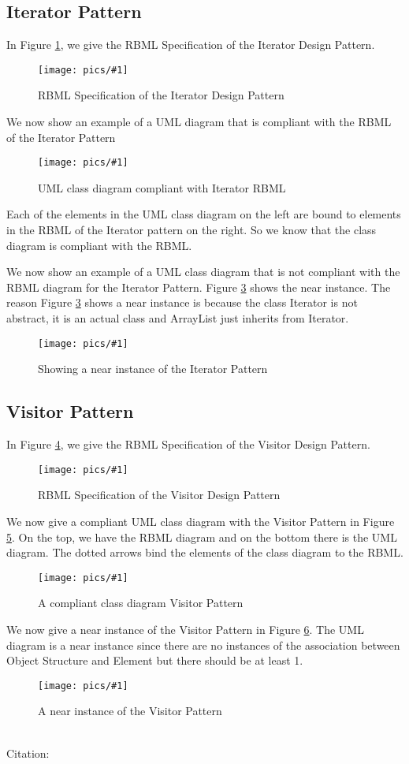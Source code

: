 \documentclass{article}
\newcommand{\fig}[3]{ 
	\begin{figure}[h]
		\centering
		\caption{#3}
		\texttt{[image: pics/\#1]}
		\label{fig:#1}
	\end{figure} 
}
\begin{document}
\subsection*{Iterator Pattern}

In Figure \ref{fig:iterator-rbml}, we give the RBML Specification of the Iterator Design Pattern.

\fig{iterator-rbml}{.5}{RBML Specification of the Iterator Design Pattern}

We now show an example of a UML diagram that is compliant with the RBML of the Iterator Pattern
\newpage
\fig{iterator-inst}{0.75}{UML class diagram compliant with Iterator RBML}

Each of the elements in the UML class diagram on the left are bound to elements in the RBML of the Iterator pattern on the right. So we know that the class diagram is compliant with the RBML.

We now show an example of a UML class diagram that is not compliant with the RBML diagram for the Iterator Pattern. Figure \ref{fig:iterator-ninst} shows the near instance. The reason Figure \ref{fig:iterator-ninst} shows a near instance is because the class Iterator is not abstract, it is an actual class and ArrayList just inherits from Iterator.

\fig{iterator-ninst}{0.15}{Showing a near instance of the Iterator Pattern}
\newpage
\subsection*{Visitor Pattern}
In Figure \ref{fig:visitor-rbml}, we give the RBML Specification of the Visitor Design Pattern.

\fig{visitor-rbml}{.75}{RBML Specification of the Visitor Design Pattern}

We now give a compliant UML class diagram with the Visitor Pattern in Figure \ref{fig:visitor-inst}. On the top, we have the RBML diagram and on the bottom there is the UML diagram. The dotted arrows bind the elements of the class diagram to the RBML.
\fig{visitor-inst}{.85}{A compliant class diagram Visitor Pattern}
\newpage
We now give a near instance of the Visitor Pattern in Figure \ref{fig:visitor-ninst}. The UML diagram is a near instance since there are no instances of the association between Object Structure and Element but there should be at least 1.
\fig{visitor-ninst}{.85}{A near instance of the Visitor Pattern}
\\
Citation: 
\newpage
\newpage
\end{document}
